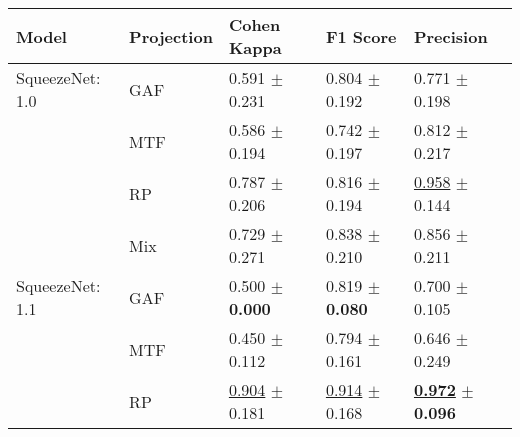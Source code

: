 
\begin{tabular}{lllll}
\toprule
Model & Projection & Cohen Kappa & F1 Score & Precision \\
\midrule
SqueezeNet: 1.0 & GAF & \textcolor[rgb]{0.6980519481,0.3019480519,0}{0.591} $\pm$ \textcolor[rgb]{0.8530779188,0.1469220812,0}{0.231} & \textcolor[rgb]{0.7070895522,0.2929104478,0}{0.804} $\pm$ \textcolor[rgb]{0.8583441002,0.1416558998,0}{0.192} & \textcolor[rgb]{0.6170212766,0.3829787234,0}{0.771} $\pm$ \textcolor[rgb]{0.6675251387,0.3324748613,0}{0.198} \\
 & MTF & \textcolor[rgb]{0.7077922078,0.2922077922,0}{0.586} $\pm$ \textcolor[rgb]{0.7152531697,0.2847468303,0}{0.194} & \textcolor[rgb]{1.0000000000,0.0000000000,0}{0.742} $\pm$ \textcolor[rgb]{0.8966243553,0.1033756447,0}{0.197} & \textcolor[rgb]{0.4893617021,0.5000000000,0}{0.812} $\pm$ \textcolor[rgb]{0.7870464475,0.2129535525,0}{0.217} \\
 & RP & \textcolor[rgb]{0.2767857143,0.5000000000,0}{0.787} $\pm$ \textcolor[rgb]{0.7594565120,0.2405434880,0}{0.206} & \textcolor[rgb]{0.6529850746,0.3470149254,0}{0.816} $\pm$ \textcolor[rgb]{0.8799950911,0.1200049089,0}{0.194} & \underline{\textcolor[rgb]{0.0425531915,0.5000000000,0}{0.958}} $\pm$ \textcolor[rgb]{0.3148185790,0.5000000000,0}{0.144} \\
 & Mix & \textcolor[rgb]{0.4017857143,0.5000000000,0}{0.729} $\pm$ \textcolor[rgb]{1.0000000000,0.0000000000,0}{0.271} & \textcolor[rgb]{0.5505427408,0.4494572592,0}{0.838} $\pm$ \textcolor[rgb]{1.0000000000,0.0000000000,0}{0.210} & \textcolor[rgb]{0.3558994197,0.5000000000,0}{0.856} $\pm$ \textcolor[rgb]{0.7517868189,0.2482131811,0}{0.211} \\
SqueezeNet: 1.1 & GAF & \textcolor[rgb]{0.8928571429,0.1071428571,0}{0.500} $\pm$ \textbf{\textcolor[rgb]{0.0000000000,0.5000000000,0}{0.000}} & \textcolor[rgb]{0.6380597015,0.3619402985,0}{0.819} $\pm$ \textbf{\textcolor[rgb]{0.0000000000,0.5000000000,0}{0.080}} & \textcolor[rgb]{0.8340425532,0.1659574468,0}{0.700} $\pm$ \textcolor[rgb]{0.0600957910,0.5000000000,0}{0.105} \\
 & MTF & \textcolor[rgb]{1.0000000000,0.0000000000,0}{0.450} $\pm$ \textcolor[rgb]{0.4127015637,0.5000000000,0}{0.112} & \textcolor[rgb]{0.7561058345,0.2438941655,0}{0.794} $\pm$ \textcolor[rgb]{0.6193728092,0.3806271908,0}{0.161} & \textcolor[rgb]{1.0000000000,0.0000000000,0}{0.646} $\pm$ \textcolor[rgb]{1.0000000000,0.0000000000,0}{0.249} \\
 & RP & \underline{\textcolor[rgb]{0.0267857143,0.5000000000,0}{0.904}} $\pm$ \textcolor[rgb]{0.6699061080,0.3300938920,0}{0.181} & \underline{\textcolor[rgb]{0.1921641791,0.5000000000,0}{0.914}} $\pm$ \textcolor[rgb]{0.6797068695,0.3202931305,0}{0.168} & \underline{\textbf{\textcolor[rgb]{0.0000000000,0.5000000000,0}{0.972}}} $\pm$ \textbf{\textcolor[rgb]{0.0000000000,0.5000000000,0}{0.096}} \\

\end{tabular}
